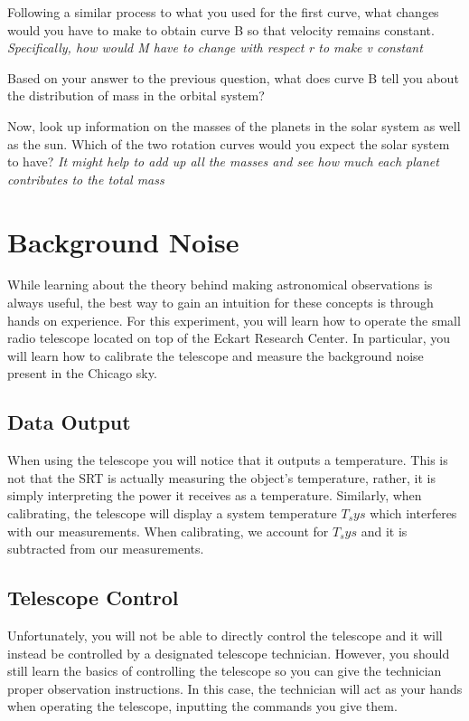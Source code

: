 \begin{steps}
	\item Following a similar process to what you used for the first curve, what changes would you have to make to obtain curve B so that velocity remains constant. \textit{Specifically, how would M have to change with respect r to make v constant}
	
	\item Based on your answer to the previous question, what does curve B tell you about the distribution of mass in the orbital system? 
	
	\item Now, look up information on the masses of the planets in the solar system as well as the sun. Which of the two rotation curves would you expect the solar system to have? \textit{It might help to add up all the masses and see how much each planet contributes to the total mass}
	
\end{steps}
	


\section{Background Noise} %
While learning about the theory behind making astronomical observations is always useful, the best way to gain an intuition for these concepts is through hands on experience. For this experiment, you will learn how to operate the small radio telescope located on top of the Eckart Research Center. In particular, you will learn how to calibrate the telescope and measure the background noise present in the Chicago sky.

\subsection{Data Output} 

When using the telescope you will notice that it outputs a temperature. This is not that the SRT is actually measuring the object's temperature, rather, it is simply interpreting the power it receives as a temperature. Similarly, when calibrating, the telescope will display a system temperature $T_sys$ which interferes with our measurements. When calibrating, we account for $T_sys$ and it is subtracted from our measurements. 

\subsection{Telescope Control}
Unfortunately, you will not be able to directly control the telescope and it will instead be controlled by a designated telescope technician. However, you should still learn the basics of controlling the telescope so you can give the technician proper observation instructions. In this case, the technician will act as your hands when operating the telescope, inputting the commands you give them.

